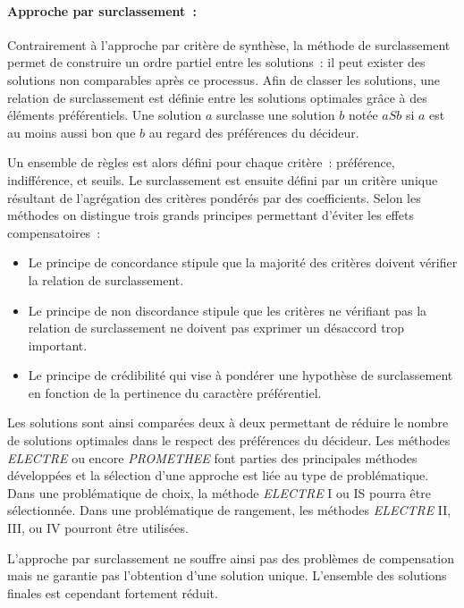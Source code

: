 \paragraph{Approche par surclassement~:} %
\label{par:approche_par_surclassement}
Contrairement à l’approche par critère de synthèse, la méthode de surclassement
permet de construire un ordre partiel entre les solutions~: il peut exister
des solutions non comparables après ce processus.
Afin de classer les solutions, une relation de surclassement est définie entre les
solutions optimales grâce à des éléments préférentiels.
Une solution $a$ surclasse une solution $b$ notée $aSb$ si $a$ est au moins aussi
bon que $b$ au regard des préférences du décideur.

Un ensemble de règles est alors défini pour chaque critère~: préférence, indifférence,
et seuils. Le surclassement est ensuite défini par un critère unique résultant de
l’agrégation des critères pondérés par des coefficients. Selon les méthodes on distingue
trois grands principes permettant d’éviter les effets compensatoires~:
\begin{itemize}
  \item Le principe de concordance stipule que la majorité des critères doivent
        vérifier la relation de surclassement.
  \item Le principe de non discordance stipule que les critères ne vérifiant pas
        la relation de surclassement ne doivent pas exprimer un désaccord trop
        important.
  \item Le principe de crédibilité qui vise à pondérer une hypothèse de surclassement
        en fonction de la pertinence du caractère préférentiel.
\end{itemize}
Les solutions sont ainsi comparées deux à deux permettant de réduire le nombre de
solutions optimales dans le respect des préférences du décideur. Les méthodes
\textit{ELECTRE} ou encore \textit{PROMETHEE} font parties des principales méthodes développées
et la sélection d’une approche est liée au type de problématique. Dans une problématique de
choix, la méthode \textit{ELECTRE} I ou IS pourra être sélectionnée. Dans une
problématique de rangement, les méthodes \textit{ELECTRE} II, III, ou IV pourront être
utilisées.

L’approche par surclassement ne souffre ainsi pas des problèmes de compensation
mais ne garantie pas l’obtention d’une solution unique. L’ensemble des solutions
finales est cependant fortement réduit.


